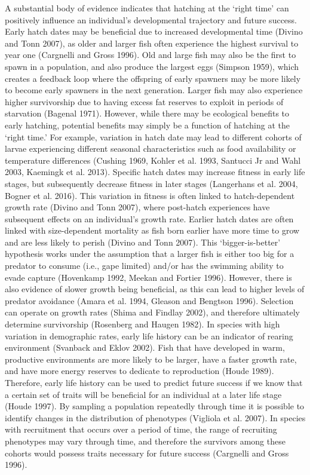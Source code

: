 \documentclass[]{book}
\begin{document}
A substantial body of evidence indicates that hatching at the `right
time' can positively influence an individual's developmental trajectory
and future success. Early hatch dates may be beneficial due to increased
developmental time (Divino and Tonn 2007), as older and larger fish
often experience the highest survival to year one (Cargnelli and Gross
1996). Old and large fish may also be the first to spawn in a
population, and also produce the largest eggs (Simpson 1959), which
creates a feedback loop where the offspring of early spawners may be
more likely to become early spawners in the next generation. Larger fish
may also experience higher survivorship due to having excess fat
reserves to exploit in periods of starvation (Bagenal 1971). However,
while there may be ecological benefits to early hatching, potential
benefits may simply be a function of hatching at the `right time.' For
example, variation in hatch date may lead to different cohorts of larvae
experiencing different seasonal characteristics such as food
availability or temperature differences (Cushing 1969, Kohler et al.
1993, Santucci Jr and Wahl 2003, Kaemingk et al. 2013). Specific hatch
dates may increase fitness in early life stages, but subsequently
decrease fitness in later stages (Langerhans et al. 2004, Bogner et al.
2016). This variation in fitness is often linked to hatch-dependent
growth rate (Divino and Tonn 2007), where post-hatch experiences have
subsequent effects on an individual's growth rate. Earlier hatch dates
are often linked with size-dependent mortality as fish born earlier have
more time to grow and are less likely to perish (Divino and Tonn 2007).
This `bigger-is-better' hypothesis works under the assumption that a
larger fish is either too big for a predator to consume (i.e., gape
limited) and/or has the swimming ability to evade capture (Hovenkamp
1992, Meekan and Fortier 1996). However, there is also evidence of
slower growth being beneficial, as this can lead to higher levels of
predator avoidance (Amara et al. 1994, Gleason and Bengtson 1996).
Selection can operate on growth rates (Shima and Findlay 2002), and
therefore ultimately determine survivorship (Rosenberg and Haugen 1982).
In species with high variation in demographic rates, early life history
can be an indicator of rearing environment (Svanback and Eklov 2002).
Fish that have developed in warm, productive environments are more
likely to be larger, have a faster growth rate, and have more energy
reserves to dedicate to reproduction (Houde 1989). Therefore, early life
history can be used to predict future success if we know that a certain
set of traits will be beneficial for an individual at a later life stage
(Houde 1997). By sampling a population repeatedly through time it is
possible to identify changes in the distribution of phenotypes (Vigliola
et al. 2007). In species with recruitment that occurs over a period of
time, the range of recruiting phenotypes may vary through time, and
therefore the survivors among these cohorts would possess traits
necessary for future success (Cargnelli and Gross 1996).
\end{document}
